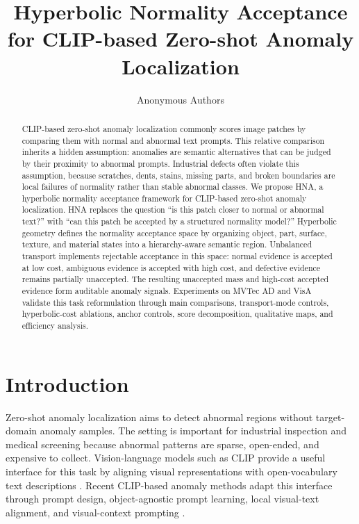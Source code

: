 \documentclass[10pt]{article}
\title{Hyperbolic Normality Acceptance for CLIP-based Zero-shot Anomaly Localization}
\author{Anonymous Authors}
\date{}
\newcommand{\method}{HNA}
\begin{document}
\maketitle

\begin{abstract}
CLIP-based zero-shot anomaly localization commonly scores image patches by comparing them with normal and abnormal text prompts.
This relative comparison inherits a hidden assumption: anomalies are semantic alternatives that can be judged by their proximity to abnormal prompts.
Industrial defects often violate this assumption, because scratches, dents, stains, missing parts, and broken boundaries are local failures of normality rather than stable abnormal classes.
We propose \method{}, a hyperbolic normality acceptance framework for CLIP-based zero-shot anomaly localization.
\method{} replaces the question ``is this patch closer to normal or abnormal text?'' with ``can this patch be accepted by a structured normality model?''
Hyperbolic geometry defines the normality acceptance space by organizing object, part, surface, texture, and material states into a hierarchy-aware semantic region.
Unbalanced transport implements rejectable acceptance in this space: normal evidence is accepted at low cost, ambiguous evidence is accepted with high cost, and defective evidence remains partially unaccepted.
The resulting unaccepted mass and high-cost accepted evidence form auditable anomaly signals.
Experiments on MVTec AD and VisA validate this task reformulation through main comparisons, transport-mode controls, hyperbolic-cost ablations, anchor controls, score decomposition, qualitative maps, and efficiency analysis.
\end{abstract}

\section{Introduction}

Zero-shot anomaly localization aims to detect abnormal regions without target-domain anomaly samples.
The setting is important for industrial inspection and medical screening because abnormal patterns are sparse, open-ended, and expensive to collect.
Vision-language models such as CLIP provide a useful interface for this task by aligning visual representations with open-vocabulary text descriptions \cite{radford2021clip}.
Recent CLIP-based anomaly methods adapt this interface through prompt design, object-agnostic prompt learning, local visual-text alignment, and visual-context prompting \cite{jeong2023winclip,zhou2024anomalyclip,chen2023aprilgan,qu2024vcpclip,ma2025aaclip}.
\end{document}
